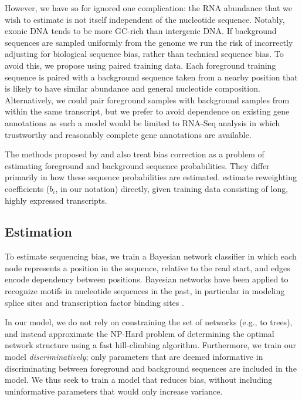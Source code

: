 \documentclass{bioinfo}
\begin{document}
However, we have so for ignored one complication: the RNA abundance that we wish
to estimate is not itself independent of the nucleotide sequence. Notably,
exonic DNA tends to be more GC-rich than intergenic DNA. If background sequences
are sampled uniformly from the genome we run the risk of incorrectly adjusting
for biological sequence bias, rather than technical sequence bias.  To avoid
this, we propose using paired training data. Each foreground training
sequence is paired with a background sequence taken from a nearby position
that is likely to have similar abundance and general nucleotide composition.
Alternatively, we could pair foreground samples with background samples from
within the same transcript, but we prefer to avoid dependence on existing
gene annotations as such a model would be limited to RNA-Seq analysis in which
trustworthy and reasonably complete gene annotations are available.

The methods proposed by \citet{Hansen2010} and \cite{Roberts2011} also treat bias
correction as a problem of estimating foreground and background sequence
probabilities. They differ primarily in how these sequence probabilities are
estimated. \citet{Li2010} estimate reweighting coefficients ($b_i$, in our
notation) directly, given training data consisting of long, highly expressed
transcripts.



\subsection{Estimation}

To estimate sequencing bias, we train a Bayesian network classifier in which
each node represents a position in the sequence, relative to the read start, and
edges encode dependency between positions.  Bayesian networks have been applied
to recognize motifs in nucleotide sequences in the past, in particular in
modeling splice sites \citep{Cai2000, Chen2005} and transcription factor binding
sites \citep{Ben-Gal2005, Grau2006, Pudimat2005}. 

In our model, we do not rely on constraining the set of networks (e.g., to
trees), and instead approximate the NP-Hard problem of determining the optimal
network structure using a fast hill-climbing algorithm. Furthermore, we
train our model \emph{discriminatively}; only parameters that are deemed
informative in discriminating between foreground and background sequences are
included in the model. We thus seek to train a model that reduces bias, without
including uninformative parameters that would only increase variance.
\end{document}
